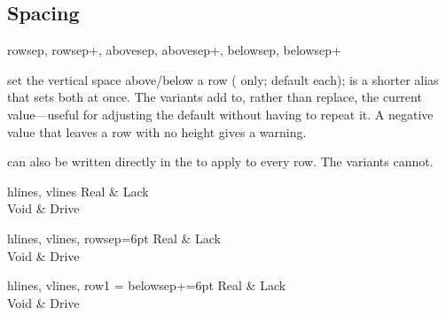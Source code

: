 \subsection{Spacing}
\begin{codedescribe}[
    key,
    new=2021G,
    update=2021L,
    update=2026A
  ]{rowsep, rowsep+, abovesep, abovesep+, belowsep, belowsep+}
  \begin{codesyntax}
  \end{codesyntax}
   set the vertical space above/below a row ( only; default \val{2pt} each);  is a shorter alias that sets both at once. The \key[no index]{+} variants add to, rather than replace, the current value---useful for adjusting the default without having to repeat it. A negative value that leaves a row with no height gives a warning.

   can also be written directly in the  to apply to every row. The \key[no index]{+} variants cannot.

  \begin{codestore}[st=columns:rowsep]
    \begin{tblr}{hlines, vlines}
      Real & Lack  \\
      Void & Drive
    \end{tblr}\quad
    \begin{tblr}{hlines, vlines, rowsep=6pt}
      Real & Lack  \\
      Void & Drive
    \end{tblr}\quad
    \begin{tblr}{
        hlines, vlines,
        row{1} = {belowsep+=6pt}
      }
      Real & Lack  \\
      Void & Drive
    \end{tblr}\end{codestore}
  \begin{center}
  \end{center}
\end{codedescribe}

